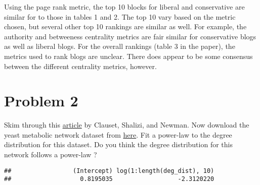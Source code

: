 \documentclass[
]{article}
\newenvironment{Shaded}{\begin{snugshade}}{\end{snugshade}}
\newcommand{\CommentTok}[1]{\textcolor[rgb]{0.56,0.35,0.01}{\textit{#1}}}
\newcommand{\DataTypeTok}[1]{\textcolor[rgb]{0.13,0.29,0.53}{#1}}
\newcommand{\DecValTok}[1]{\textcolor[rgb]{0.00,0.00,0.81}{#1}}
\newcommand{\KeywordTok}[1]{\textcolor[rgb]{0.13,0.29,0.53}{\textbf{#1}}}
\newcommand{\NormalTok}[1]{#1}
\newcommand{\OperatorTok}[1]{\textcolor[rgb]{0.81,0.36,0.00}{\textbf{#1}}}
\newcommand{\OtherTok}[1]{\textcolor[rgb]{0.56,0.35,0.01}{#1}}
\newcommand{\StringTok}[1]{\textcolor[rgb]{0.31,0.60,0.02}{#1}}
\begin{document}
Using the page rank metric, the top 10 blocks for liberal and
conservative are similar for to those in tables 1 and 2. The top 10 vary
based on the metric chosen, but several other top 10 rankings are
similar as well. For example, the authority and betweeness centrality
metrics are fair similar for conservative blogs as well as liberal
blogs. For the overall rankings (table 3 in the paper), the metrics used
to rank blogs are unclear. There does appear to be some consensus
between the different centrality metrics, however.

\hypertarget{problem-2}{%
\section{Problem 2}\label{problem-2}}

Skim through this \href{https://arxiv.org/pdf/0706.1062.pdf}{article} by
Clauset, Shalizi, and Newman. Now download the yeast metabolic network
dataset from
\href{http://tuvalu.santafe.edu/~aaronc/powerlaws/data.htm}{here}. Fit a
power-law to the degree distribution for this dataset. Do you think the
degree distribution for this network follows a power-law ?

\begin{Shaded}
\end{Shaded}

\begin{verbatim}
##                 (Intercept) log(1:length(deg_dist), 10) 
##                   0.8195035                  -2.3120220
\end{verbatim}
\end{document}
